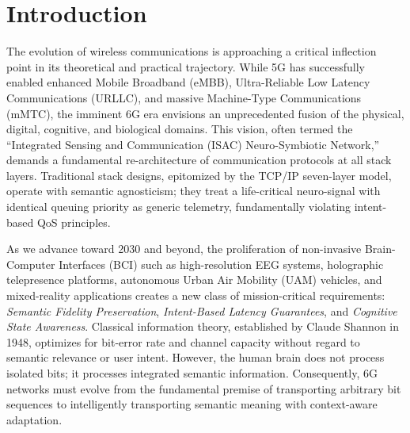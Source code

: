 \documentclass{BVP_CINC}
\begin{document}
\section{Introduction}
The evolution of wireless communications is approaching a critical inflection point in its theoretical and practical trajectory. While 5G has successfully enabled enhanced Mobile Broadband (eMBB), Ultra-Reliable Low Latency Communications (URLLC), and massive Machine-Type Communications (mMTC), the imminent 6G era envisions an unprecedented fusion of the physical, digital, cognitive, and biological domains. This vision, often termed the ``Integrated Sensing and Communication (ISAC) Neuro-Symbiotic Network,'' demands a fundamental re-architecture of communication protocols at all stack layers. Traditional stack designs, epitomized by the TCP/IP seven-layer model, operate with semantic agnosticism; they treat a life-critical neuro-signal with identical queuing priority as generic telemetry, fundamentally violating intent-based QoS principles.

As we advance toward 2030 and beyond, the proliferation of non-invasive Brain-Computer Interfaces (BCI) such as high-resolution EEG systems, holographic telepresence platforms, autonomous Urban Air Mobility (UAM) vehicles, and mixed-reality applications creates a new class of mission-critical requirements: \textit{Semantic Fidelity Preservation}, \textit{Intent-Based Latency Guarantees}, and \textit{Cognitive State Awareness}. Classical information theory, established by Claude Shannon in 1948, optimizes for bit-error rate and channel capacity without regard to semantic relevance or user intent. However, the human brain does not process isolated bits; it processes integrated semantic information. Consequently, 6G networks must evolve from the fundamental premise of transporting arbitrary bit sequences to intelligently transporting semantic meaning with context-aware adaptation.
\end{document}
